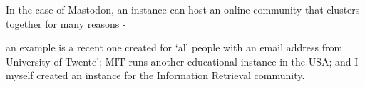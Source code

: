 \documentclass[a4paper,twoside,12pt]{article}
\begin{document}
In the case of Mastodon, an instance can host an online community that clusters together for many reasons - 

an example is a recent one created for `all people with an email address from University of Twente'; MIT runs another educational instance in the USA; and I myself created an instance for the Information Retrieval community. 










\end{document}

